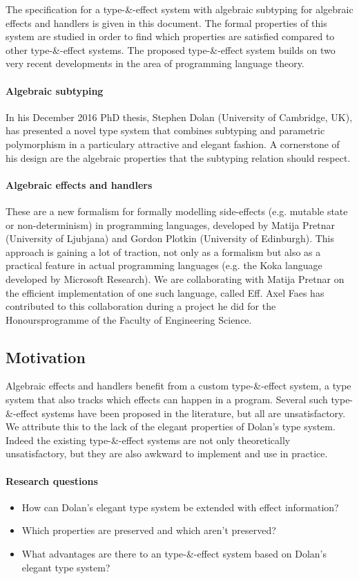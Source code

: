 The specification for a type-\&-effect system with algebraic subtyping for algebraic effects and handlers is given in this document. The formal properties of this system are studied in order to find which properties are satisfied compared to other type-\&-effect systems. The proposed type-\&-effect system builds on two very recent developments in the area of programming language theory.

\paragraph{Algebraic subtyping}
In his December 2016 PhD thesis, Stephen Dolan (University of Cambridge, UK), has presented a novel type system that combines subtyping and parametric polymorphism in a particulary attractive and elegant fashion. A cornerstone of his design are the algebraic properties that the subtyping relation should respect.

\paragraph{Algebraic effects and handlers}
These are a new formalism for formally modelling side-effects (e.g. mutable state or non-determinism) in programming languages, developed by Matija Pretnar (University of Ljubjana) and Gordon Plotkin (University of Edinburgh). This approach is gaining a lot of traction, not only as a formalism but also as a practical feature in actual programming languages (e.g. the Koka language developed by Microsoft Research). We are collaborating with Matija Pretnar on the efficient implementation of one such language, called Eff. Axel Faes has contributed to this collaboration during a project he did for the Honoursprogramme of the Faculty of Engineering Science.

\subsection{Motivation}
Algebraic effects and handlers benefit from a custom type-\&-effect system, a type system that also tracks which effects can happen in a program. Several such type-\&-effect systems have been proposed in the literature, but all are unsatisfactory. We attribute this to the lack of the elegant properties of Dolan's type system. Indeed the existing type-\&-effect systems are not only theoretically unsatisfactory, but they are also awkward to implement and use in practice.

\paragraph{Research questions}
\begin{itemize}
\item How can Dolan's elegant type system be extended with effect information?
\item Which properties are preserved and which aren't preserved?
\item What advantages are there to an type-\&-effect system based on Dolan's elegant type system?
\end{itemize}


